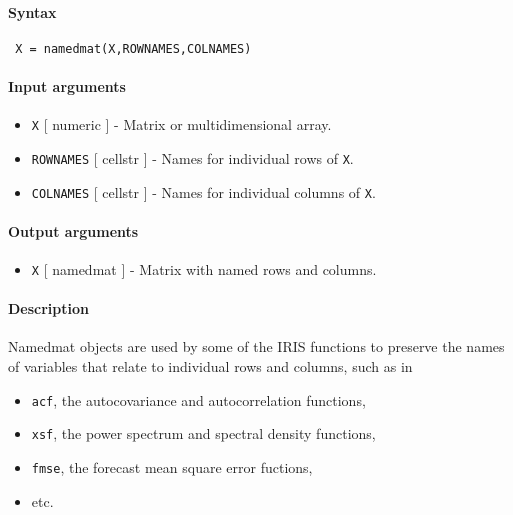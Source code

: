 


	\paragraph{Syntax}
 
 \begin{verbatim}
 X = namedmat(X,ROWNAMES,COLNAMES)
 \end{verbatim}
 
 \paragraph{Input arguments}
 
 \begin{itemize}
 \item
   \texttt{X} {[} numeric {]} - Matrix or multidimensional array.
 \item
   \texttt{ROWNAMES} {[} cellstr {]} - Names for individual rows of
   \texttt{X}.
 \item
   \texttt{COLNAMES} {[} cellstr {]} - Names for individual columns of
   \texttt{X}.
 \end{itemize}
 
 \paragraph{Output arguments}
 
 \begin{itemize}
 \item
   \texttt{X} {[} namedmat {]} - Matrix with named rows and columns.
 \end{itemize}
 
 \paragraph{Description}
 
 Namedmat objects are used by some of the IRIS functions to preserve the
 names of variables that relate to individual rows and columns, such as
 in
 
 \begin{itemize}
 \item
   \texttt{acf}, the autocovariance and autocorrelation functions,
 \item
   \texttt{xsf}, the power spectrum and spectral density functions,
 \item
   \texttt{fmse}, the forecast mean square error fuctions,
 \item
   etc.
 \end{itemize}
 
